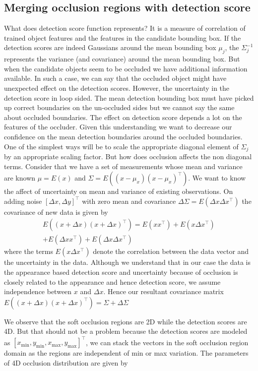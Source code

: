 \documentclass[10pt,twocolumn,letterpaper]{article}
\begin{document}
\subsection{Merging occlusion regions with detection score}
What does detection score function represents? It is a measure of
correlation of trained object features and the features in the candidate
bounding box. If the detection scores are indeed Gaussians around the mean
bounding box $\mu_j$, the $\Sigma_j^{-1}$ represents the variance (and
covariance) around the mean bounding box. But when the candidate objects seem
to be occluded we have additional information available. In such a case, we
can say that the occluded object might have unexpected effect on the detection
scores. However, the uncertainty in the detection score in loop sided. The
mean detection bounding box must have picked up correct boundaries on the
un-occluded sides but we cannot say the same about occluded boundaries. The
effect on detection score depends a lot on the features of the occluder. Given
this understanding we want to decrease our confidence on the mean detection
boundaries around the occluded boundaries. One of the simplest ways will be to
scale the appropriate diagonal element of $\Sigma_j$ by an appropriate scaling
factor. But how does occlusion affects the non diagonal terms. Consider that we
have a set of measurements whose mean and variance are known $\mu = E(x)$ and $\Sigma = E ((x - \mu_x)(x - \mu_x)^\top)$. We want to know the
affect of uncertainty on mean and variance of existing observations. On adding
noise $[\Delta x, \Delta y]^\top$ with zero mean and covariance $\Delta
\Sigma = E(\Delta x \Delta x^\top)$ the covariance of new data is given by
\begin{multline}
  E((x + \Delta x)(x+\Delta x)^\top) = E(xx^\top) + E(x \Delta x^\top) \\
  + E(\Delta x x^\top) + E(\Delta x \Delta x^\top)
\end{multline}
where the terms $E(x \Delta x^\top)$ denote the correlation between the data
vector and the uncertainty in the data. Although we understand that in our case
the data is the appearance based detection score and uncertainty because of
occlusion is closely related to the appearance and hence detection score, we
assume independence between $x$ and $\Delta x$. Hence our resultant covariance
matrix $ E((x + \Delta x)(x+\Delta x)^\top) = \Sigma + \Delta \Sigma$

We observe that the soft occlusion regions are 2D while the detection scores
are 4D. But that should not be a problem because the detection scores are
modeled as $[x_{\text{min}}, y_{\text{min}}, x_{\text{max}},
y_{\text{max}}]^\top$, we can stack the vectors in the soft occlusion region
domain as the regions are independent of min or max variation. The parameters
of 4D occlusion distribution are given by
\end{document}
